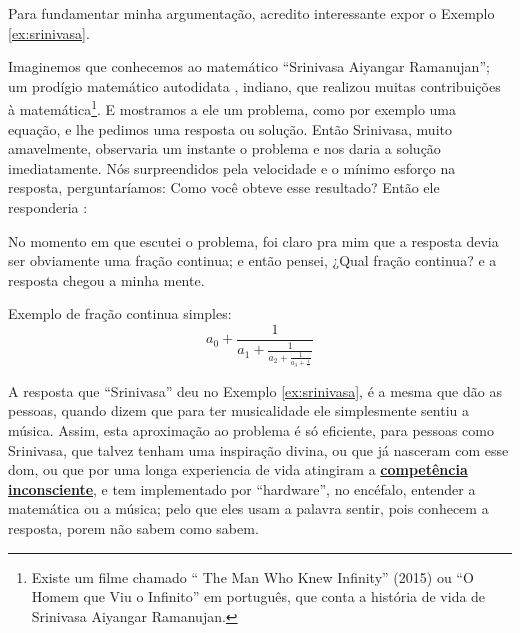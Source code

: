 Para fundamentar minha argumentação, acredito interessante expor o Exemplo \ref{ex:srinivasa}. 
\begin{example}
\label{ex:srinivasa}
Imaginemos que conhecemos ao matemático ``Srinivasa Aiyangar Ramanujan'';
um prodígio matemático autodidata \cite[pp. 1]{kanigel2016man}, indiano, que 
realizou muitas contribuições à matemática\footnote{Existe 
um filme chamado `` The Man Who Knew Infinity'' (2015) ou 
``O Homem que Viu o Infinito'' em português, que conta a história de vida de Srinivasa Aiyangar Ramanujan.}.
E mostramos a ele um problema, %
como por exemplo uma equação,
e  lhe pedimos uma resposta ou solução. 
Então Srinivasa, muito amavelmente, 
observaria um instante o problema e nos daria a solução imediatamente.
Nós surpreendidos pela velocidade e o mínimo esforço na resposta,
perguntaríamos: Como você obteve esse resultado? Então ele responderia \cite[pp. 235]{kanigel2016man}: 
\begin{citando}
No momento em que escutei o problema, 
foi claro pra mim que a resposta devia ser obviamente uma fração continua; 
e então pensei, ¿Qual fração continua? e a resposta chegou a minha mente. 
\end{citando}

Exemplo de fração continua simples:
\begin{equation}
a_{0}+{\frac {1}{a_{1}+{\frac {1}{a_{2}+{\frac {1}{a_{3}+{\frac {1}{\ddots }}}}}}}}
\end{equation}
\end{example}

A resposta que ``Srinivasa'' deu no Exemplo  \ref{ex:srinivasa}, 
é a mesma  que dão as pessoas, quando  dizem que para ter musicalidade ele simplesmente sentiu a música. 
Assim, esta aproximação ao problema é só eficiente, para pessoas como Srinivasa, 
que talvez tenham uma inspiração divina, 
ou que já nasceram com esse dom, ou que por uma longa experiencia de vida atingiram 
a \hyperref[ref:CompetenciaInconsciente]{\textbf{competência inconsciente}}, 
e tem implementado por ``hardware'', no encéfalo, entender a matemática ou a música; 
pelo que eles usam a palavra sentir, 
pois conhecem a resposta, porem não sabem como sabem. 

